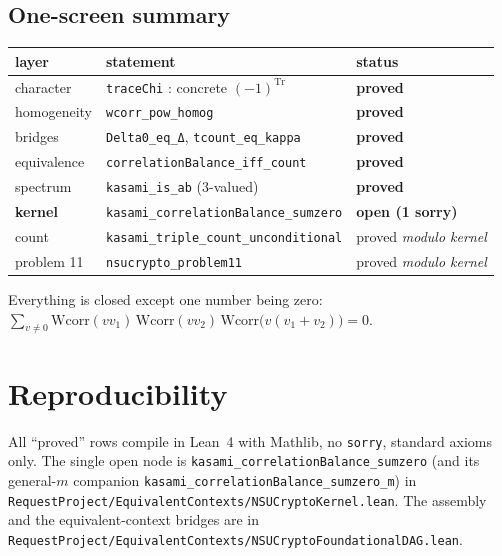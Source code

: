 \documentclass[11pt]{article}
\begin{document}
\bigskip
\subsection*{One-screen summary}

\begin{center}
\renewcommand{\arraystretch}{1.6}
\begin{tabular}{l l l}
\textbf{layer} & \textbf{statement} & \textbf{status} \\
\hline
character & \texttt{traceChi} : concrete $(-1)^{\mathrm{Tr}}$ & \textbf{proved} \\
homogeneity & \texttt{wcorr\_pow\_homog} & \textbf{proved} \\
bridges & \texttt{Delta0\_eq\_Δ}, \texttt{tcount\_eq\_kappa} & \textbf{proved} \\
equivalence & \texttt{correlationBalance\_iff\_count} & \textbf{proved} \\
spectrum & \texttt{kasami\_is\_ab} (3-valued) & \textbf{proved} \\
\rowcolor{leanbg}
\textbf{kernel} & \texttt{kasami\_correlationBalance\_sumzero} & \textbf{open (1 sorry)} \\
count & \texttt{kasami\_triple\_count\_unconditional} & proved \emph{modulo kernel} \\
problem 11 & \texttt{nsucrypto\_problem11} & proved \emph{modulo kernel} \\
\end{tabular}
\end{center}

\bigskip
\noindent
\colorbox{leanbg}{\parbox{\dimexpr\linewidth-2\fboxsep}{\centering
Everything is closed except one number being zero:\\[2pt]
$\displaystyle\sum_{v\neq0}\mathrm{Wcorr}(v v_1)\,\mathrm{Wcorr}(v v_2)\,
\mathrm{Wcorr}\bigl(v(v_1{+}v_2)\bigr)=0.$}}

\bigskip

\section*{Reproducibility}

\noindent
All ``proved'' rows compile in Lean~4 with Mathlib, no \texttt{sorry}, standard
axioms only.  The single open node is
\texttt{kasami\_correlationBalance\_sumzero} (and its general-$m$ companion
\texttt{kasami\_correlationBalance\_sumzero\_m}) in
\texttt{RequestProject/EquivalentContexts/NSUCryptoKernel.lean}.
The assembly and the equivalent-context bridges are in
\texttt{RequestProject/EquivalentContexts/NSUCryptoFoundationalDAG.lean}.
\end{document}
